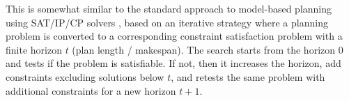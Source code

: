 This is somewhat similar to the standard approach to model-based planning 
using SAT/IP/CP solvers \cite{kautz1992planning,van2005optiplan}, %
based on an iterative strategy where a planning problem is converted to a corresponding constraint satisfaction problem with a finite horizon $t$ (plan length / makespan). The search starts from the horizon 0 and tests if the problem is satisfiable. If not, then it increases the horizon, add constraints excluding solutions below $t$, and retests the same problem with additional constraints for a new horizon $t+1$.







